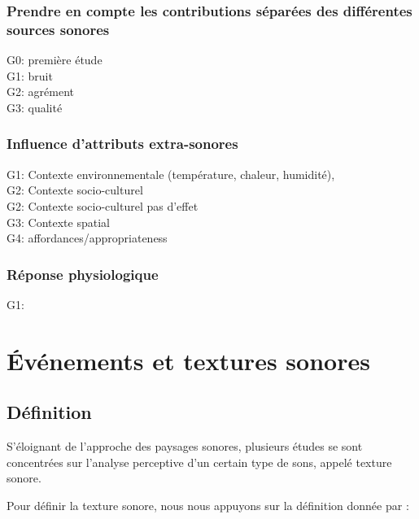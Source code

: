 \subsubsection{Prendre en compte les contributions séparées des différentes sources sonores}

G0: \citep{defreville2004aactivity} première étude\\
G1: \citep{marquis2015simulated} bruit\\
G2:  \citep{lavandier2006contribution,guillen2007importance} agrément\\
G3:  \citep{nilsson2007soundscape,ricciardi2015sound} qualité

\subsubsection{Influence d'attributs extra-sonores}

G1: Contexte environnementale (température, chaleur, humidité), \citep{meng2013field,jeon2011non} \\
G2: Contexte socio-culturel \citep{hall2013exploratory,yu2010factors}\\
G2: Contexte socio-culturel \citep{guillen2007importance} pas d'effet\\
G3: Contexte spatial \citep{hall2013exploratory}\\
G4: affordances/appropriateness \citep{hall2013exploratory}

\subsubsection{Réponse physiologique}

G1: \citep{hume2013physiological}

\section{Événements et textures sonores}

\subsection{Définition}

S'éloignant de l'approche des paysages sonores, plusieurs études se sont concentrées sur l'analyse perceptive d'un certain type de sons, appelé texture sonore.

Pour définir la texture sonore, nous nous appuyons sur la définition donnée par \citep[p. 25]{saint1995classification}:  

